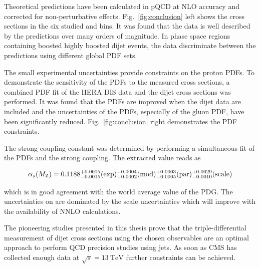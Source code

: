 Theoretical predictions have been calculated in pQCD at NLO accuracy and
corrected for non-perturbative effects. Fig.~\ref{fig:conclusion} left shows the
cross sections in the six studied \ystar and \yboost bins. It was found that the
data is well described by the predictions over many orders of magnitude. In
phase space regions containing boosted highly boosted dijet events, the data
discriminate between the predictions using different global PDF sets.

The small experimental uncertainties provide constraints on the proton PDFs. To
demonstrate the sensitivity of the PDFs to the measured cross sections, a
combined PDF fit of the HERA DIS data and the dijet cross sections was performed. It
was found that the PDFs are improved when the dijet data are included and the
uncertainties of the PDFs, especially of the gluon PDF, have been significantly
reduced. Fig.~\ref{fig:conclusion} right demonstrates the PDF constraints.

The strong coupling constant \asmz was determined by performing a simultaneous
fit of the PDFs and the strong coupling. The extracted value reads as

\begin{equation*}
  \alpha_{s}(M_\mathrm{Z}) = 0.1188_{-0.0015}^{+0.0015}(\mathrm{exp})_{-0.0002}^{+0.0004}(\mathrm{mod})_{-0.0005}^{+0.0003}(\mathrm{par})_{-0.0010}^{+0.0029}(\mathrm{scale})
\end{equation*}

which is in good agreement with the world average value of the PDG. The
uncertainties on \asmz are dominated by the scale uncertainties which will
improve with the availability of NNLO calculations.

The pioneering studies presented in this thesis prove that the triple-differential
measurement of dijet cross sections using the chosen observables are an optimal
approach to perform QCD precision studies using jets. As soon as CMS has
collected enough data at $\sqrt{s}=\SI{13}{\TeV}$ further constraints can be
achieved. 

